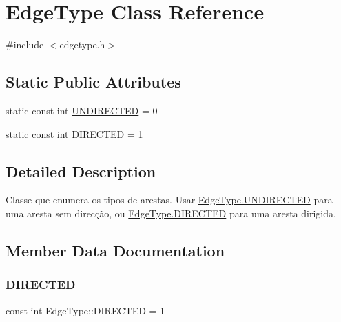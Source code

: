 \hypertarget{class_edge_type}{}\section{Edge\+Type Class Reference}
\label{class_edge_type}


{\ttfamily \#include $<$edgetype.\+h$>$}

\subsection*{Static Public Attributes}
\begin{DoxyCompactItemize}
\item 
static const int \mbox{\hyperlink{class_edge_type_a6533cc56d05c288a550b9980b66c9317}{U\+N\+D\+I\+R\+E\+C\+T\+ED}} = 0
\item 
static const int \mbox{\hyperlink{class_edge_type_a903017a534f2818c2d17145e4ae0321c}{D\+I\+R\+E\+C\+T\+ED}} = 1
\end{DoxyCompactItemize}


\subsection{Detailed Description}
Classe que enumera os tipos de arestas. Usar \mbox{\hyperlink{class_edge_type_a6533cc56d05c288a550b9980b66c9317}{Edge\+Type.\+U\+N\+D\+I\+R\+E\+C\+T\+ED}} para uma aresta sem direcção, ou \mbox{\hyperlink{class_edge_type_a903017a534f2818c2d17145e4ae0321c}{Edge\+Type.\+D\+I\+R\+E\+C\+T\+ED}} para uma aresta dirigida. 

\subsection{Member Data Documentation}
\mbox{\label{class_edge_type_a903017a534f2818c2d17145e4ae0321c}} 
\subsubsection{\texorpdfstring{D\+I\+R\+E\+C\+T\+ED}{DIRECTED}}
{\footnotesize\ttfamily const int Edge\+Type\+::\+D\+I\+R\+E\+C\+T\+ED = 1\hspace{0.3cm}{\ttfamily [static]}}

\mbox{\label{class_edge_type_a6533cc56d05c288a550b9980b66c9317}} 
